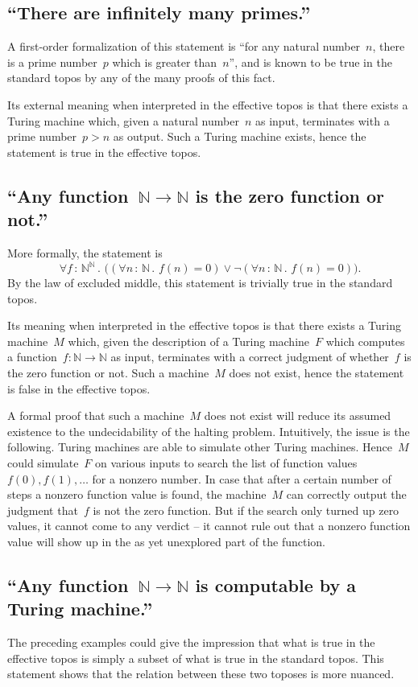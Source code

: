 \documentclass[oneside]{amsart}
\theoremstyle{definition}
\theoremstyle{plain}
\theoremstyle{remark}
\newcommand{\NN}{\mathbb{N}}
\renewcommand{\_}{\mathpunct{.}\,}
\newcommand{\effective}{ef{}fective\xspace}
\newcommand{\?}{\,{:}\,}
\begin{document}
\subsection{``There are infinitely many primes.''} A first-order formalization
of this statement is ``for any natural number~$n$, there is a prime
number~$p$ which is greater than~$n$'', and is known to be true in the standard
topos by any of the many proofs of this fact.

Its external meaning when interpreted in the \effective topos is that there exists
a Turing machine which, given a natural number~$n$ as input, terminates with a
prime number~$p > n$ as output. Such a Turing machine exists, hence the
statement is true in the \effective topos.


\subsection{``Any function~$\NN \to \NN$ is the zero function or not.''} More
formally, the statement is
\[ \forall f \? \NN^\NN\_
  \bigl((\forall n \? \NN\_ f(n) = 0) \vee
  \neg
  (\forall n \? \NN\_ f(n) = 0)\bigr). \]
By the law of excluded middle, this statement is trivially true in the standard
topos.

Its meaning when interpreted in the \effective topos is that there exists a
Turing machine~$M$ which, given the description of a Turing machine~$F$ which
computes a function~$f : \NN \to \NN$ as input, terminates with a correct
judgment of whether~$f$ is the zero function or not. Such a machine~$M$ does
not exist, hence the statement is false in the \effective topos.

A formal proof that such a machine~$M$ does not exist will reduce its assumed
existence to the undecidability of the halting problem. Intuitively, the issue
is the following. Turing machines are able to simulate other Turing machines.
Hence~$M$ could simulate~$F$ on various inputs to search the list of
function values~$f(0), f(1), \ldots$ for a nonzero number. In case that after
a certain number of steps a nonzero function value is found, the machine~$M$
can correctly output the judgment that~$f$ is not the zero function. But if the
search only turned up zero values, it cannot come to any verdict -- it cannot
rule out that a nonzero function value will show up in the as yet unexplored
part of the function.


\subsection{``Any function~$\NN \to \NN$ is computable by a Turing machine.''}
The preceding examples could give the impression that what is true in the
\effective topos is simply a subset of what is true in the standard topos. This
statement shows that the relation between these two toposes is more nuanced.
\end{document}
